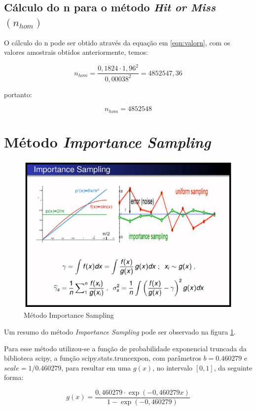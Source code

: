 \documentclass{article}
\begin{document}
\subsection{Cálculo do n para o método \textit{Hit or Miss} $(n_{hom})$}

O cálculo do n pode ser obtido através da equação em \ref{eqn:valorn}, com os valores amostrais obtidos anteriormente, temos:

\begin{equation*}
    n_{hom} = \frac{0,1824\cdot1,96^2}{0,00038^2} = 4852547,36
\end{equation*}

portanto:

\[
    n_{hom} = 4852548
\]


\section{Método \textit{Importance Sampling}}

\begin{figure}[H]
    \centering
    \includegraphics[width=.7\linewidth]{Imagens/MC_ImportanceSampling.png}
    \caption{Método Importance Sampling}
    \label{fig:ImpSam}
\end{figure}

Um resumo do método \textit{Importance Sampling} pode ser observado na figura \ref{fig:ImpSam}.\newline  

Para esse método utilizou-se a função de probabilidade exponencial truncada da biblioteca scipy\cite{2020SciPy-NMeth}, a função scipy.stats.truncexpon, com parâmetros $b = 0.460279$ e $scale = 1/0.460279$, para resultar em uma $g(x)$, no intervalo $[0,1]$, da seguinte forma:

\begin{equation*}
    g(x) = \frac{0,460279\cdot \exp(-0,460279x)}{1-\exp(-0,460279)}
\end{equation*}
\end{document}
